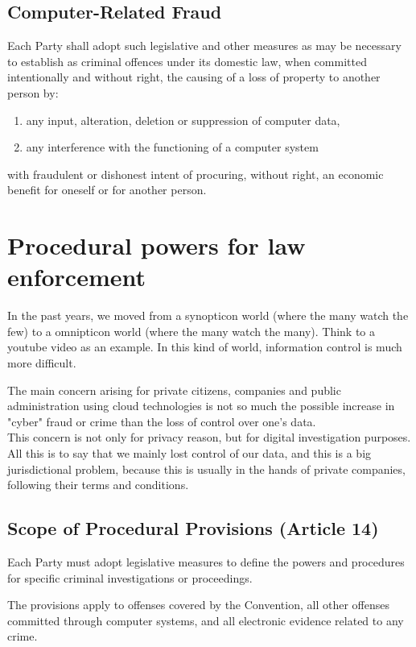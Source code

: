 \subsection{Computer-Related Fraud}
Each Party shall adopt such legislative and other measures as may be
necessary to establish as criminal offences under its domestic law,
when committed intentionally and without right, the causing of a loss
of property to another person by:
\begin{enumerate}
  \item any input, alteration, deletion or suppression of computer data,
  \item any interference with the functioning of a computer system 
\end{enumerate}
with fraudulent or dishonest intent of procuring, without right, an
economic benefit for oneself or for another person.

\section{Procedural powers for law enforcement}
In the past years, we moved from a synopticon world (where the 
many watch the few) to a omnipticon world (where the many watch the
many). Think to a youtube video as an example. In this kind of world,
information control is much more difficult.

The main concern arising for private citizens, companies and public
administration using cloud technologies is not so much the possible
increase in "cyber" fraud or crime than the loss of control over one's
data.\\
This concern is not only for privacy reason, but for digital
investigation purposes.\\

All this is to say that we mainly lost control of our data, and this
is a big jurisdictional problem, because this is usually in the hands
of private companies, following their terms and conditions.
\subsection{Scope of Procedural Provisions (Article 14)}
Each Party must adopt legislative measures to define the powers and
procedures for specific criminal investigations or proceedings.

The provisions apply to offenses covered by the Convention, all other
offenses committed through computer systems, and all electronic
evidence related to any crime.
